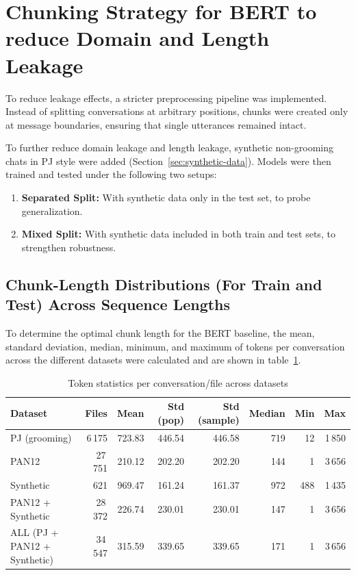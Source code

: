 \section{Chunking Strategy for BERT to reduce Domain and Length Leakage}

To reduce leakage effects, a stricter preprocessing pipeline was implemented. Instead of splitting conversations at arbitrary positions, chunks were created only at message boundaries, ensuring that single utterances remained intact.

To further reduce domain leakage and length leakage, synthetic non-grooming chats in PJ style were added (Section~\ref{sec:synthetic-data}). Models were then trained and tested under the following two setups: 

\begin{enumerate}
  \item \textbf{Separated Split:} With synthetic data only in the test set, to probe generalization.
  \item \textbf{Mixed Split:} With synthetic data included in both train and test sets, to strengthen robustness.
\end{enumerate}


\subsection{Chunk-Length Distributions (For Train and Test) Across Sequence Lengths}\label{sec:chunk-length-distributions}

To determine the optimal chunk length for the BERT baseline, the mean, standard deviation, median, minimum, and maximum of tokens per conversation across the different datasets were calculated and are shown in table~\ref{tab:token_stats}. 

\begin{table}[htbp]
\centering
\caption{Token statistics per conversation/file across datasets}
\label{tab:token_stats}
\begin{tabular}{lrrrrrrr}
\toprule
\textbf{Dataset} & \textbf{Files} & \textbf{Mean} & \textbf{Std (pop)} & \textbf{Std (sample)} & \textbf{Median} & \textbf{Min} & \textbf{Max} \\
\midrule
PJ (grooming)                & 6\,175  & 723.83 & 446.54 & 446.58 & 719  & 12  & 1\,850 \\
PAN12                        & 27\,751 & 210.12 & 202.20 & 202.20 & 144  & 1   & 3\,656 \\
Synthetic                    & 621     & 969.47 & 161.24 & 161.37 & 972  & 488 & 1\,435 \\
PAN12 + Synthetic            & 28\,372 & 226.74 & 230.01 & 230.01 & 147  & 1   & 3\,656 \\
ALL (PJ + PAN12 + Synthetic) & 34\,547 & 315.59 & 339.65 & 339.65 & 171  & 1   & 3\,656 \\
\bottomrule
\end{tabular}
\end{table}

